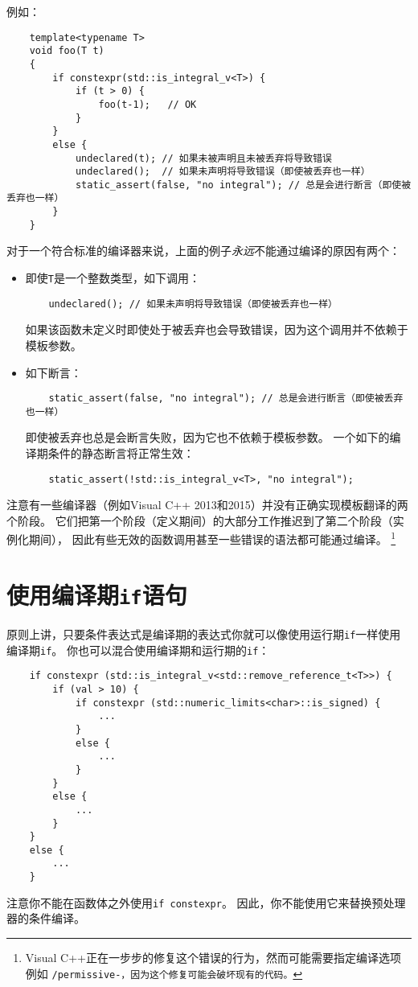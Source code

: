 例如：
\begin{lstlisting}
    template<typename T>
    void foo(T t)
    {
        if constexpr(std::is_integral_v<T>) {
            if (t > 0) {
                foo(t-1);   // OK
            }
        }
        else {
            undeclared(t); // 如果未被声明且未被丢弃将导致错误
            undeclared();  // 如果未声明将导致错误（即使被丢弃也一样）
            static_assert(false, "no integral"); // 总是会进行断言（即使被丢弃也一样）
        }
    }
\end{lstlisting}
对于一个符合标准的编译器来说，上面的例子\emph{永远}不能通过编译的原因有两个：
\begin{itemize}
    \item 即使\texttt{T}是一个整数类型，如下调用：
    \begin{lstlisting}
    undeclared(); // 如果未声明将导致错误（即使被丢弃也一样）
    \end{lstlisting}
    如果该函数未定义时即使处于被丢弃也会导致错误，因为这个调用并不依赖于模板参数。
    \item 如下断言：
    \begin{lstlisting}
    static_assert(false, "no integral"); // 总是会进行断言（即使被丢弃也一样）
    \end{lstlisting}
    即使被丢弃也总是会断言失败，因为它也不依赖于模板参数。
    一个如下的编译期条件的静态断言将正常生效：
    \begin{lstlisting}
    static_assert(!std::is_integral_v<T>, "no integral");
    \end{lstlisting}
\end{itemize}
注意有一些编译器（例如Visual C++ 2013和2015）并没有正确实现模板翻译的两个阶段。
它们把第一个阶段（定义期间）的大部分工作推迟到了第二个阶段（实例化期间），
因此有些无效的函数调用甚至一些错误的语法都可能通过编译。
\footnote{Visual C++正在一步步的修复这个错误的行为，然而可能需要指定编译选项例如
\texttt{/permissive-，因为这个修复可能会破坏现有的代码。}}

\section{使用编译期\texttt{if}语句}
原则上讲，只要条件表达式是编译期的表达式你就可以像使用运行期\texttt{if}一样使用编译期\texttt{if}。
你也可以混合使用编译期和运行期的\texttt{if}：
\begin{lstlisting}
    if constexpr (std::is_integral_v<std::remove_reference_t<T>>) {
        if (val > 10) {
            if constexpr (std::numeric_limits<char>::is_signed) {
                ...
            }
            else {
                ...
            }
        }
        else {
            ...
        }
    }
    else {
        ...
    }
\end{lstlisting}
注意你不能在函数体之外使用\texttt{if constexpr}。
因此，你不能使用它来替换预处理器的条件编译。

